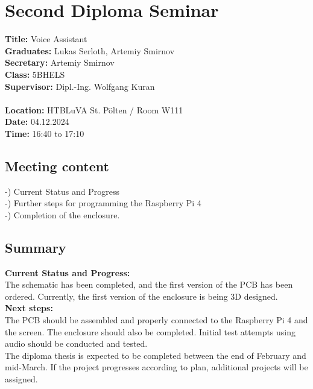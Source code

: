 
\section{Second Diploma Seminar}
\textbf{Title:} Voice Assistant\\

\noindent\textbf{Graduates:} Lukas Serloth, Artemiy Smirnov\\

\noindent\textbf{Secretary:} Artemiy Smirnov\\

\noindent\textbf{Class:} 5BHELS\\

\noindent\textbf{Supervisor:} Dipl.-Ing. Wolfgang Kuran\\ \\

\noindent\textbf{Location:} HTBLuVA St. Pölten / Room W111\\

\noindent\textbf{Date:} 04.12.2024\\

\noindent\textbf{Time:} 16:40 to 17:10\\ 

\subsection{Meeting content}
-) Current Status and Progress \\ -) Further steps for programming the Raspberry Pi 4 \\ -) Completion of the enclosure. \\

\subsection{Summary}
\textbf{Current Status and Progress:\\} 
The schematic has been completed, and the first version of the PCB has been ordered. Currently, the first version of the enclosure is being 3D designed.\\

\noindent\textbf{Next steps:\\}
The PCB should be assembled and properly connected to the Raspberry Pi 4 and the screen. The enclosure should also be completed. Initial test attempts using audio should be conducted and tested.\\The diploma thesis is expected to be completed between the end of February and mid-March. If the project progresses according to plan, additional projects will be assigned.

